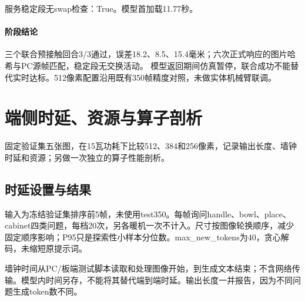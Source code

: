 服务稳定段无swap检查：True。模型首加载11.77秒。


\paragraph{阶段结论}三个联合预接触回合3/3通过，误差18.2、8.5、15.4毫米；六次正式响应的图片哈希与PC源帧匹配，稳定段无交换活动。 模型返回期间仿真暂停，联合成功不能替代实时达标。512像素配置沿用既有350帧精度对照，未做实体机械臂联调。



\FloatBarrier

\section{端侧时延、资源与算子剖析}

\label{stage:s24}

固定验证集五张图，在15瓦功耗下比较512、384和256像素，记录输出长度、墙钟时延和资源；另做一次独立的算子性能剖析。

\subsection{时延设置与结果}\label{s24-detail-1}

输入为冻结验证集排序前5帧，未使用test350。每帧询问handle、bowl、place、cabinet四类问题，每档20次，另各暖机一次不计入。尺寸按图像轮换顺序，减少固定顺序影响；P95只是探索性小样本分位数。max\_new\_tokens为40，贪心解码，未缩短原提示词。

墙钟时间从PC/板端测试脚本读取和处理图像开始，到生成文本结束；不含网络传输。模型内时间另存，不能将其替代端到端时延。输出长度一并报告，因为不同问题生成token数不同。


